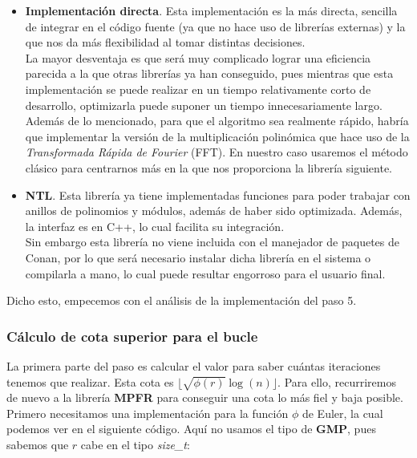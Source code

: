 \begin{itemize}
	\item \textbf{Implementación directa}. Esta implementación es la más directa, sencilla de integrar en el código fuente (ya que no hace uso de librerías externas) y la que nos da más flexibilidad al tomar distintas decisiones.\\
	
	La mayor desventaja es que será muy complicado lograr una eficiencia parecida a la que otras librerías ya han conseguido, pues mientras que esta implementación se puede realizar en un tiempo relativamente corto de desarrollo, optimizarla puede suponer un tiempo innecesariamente largo.\\
	
	Además de lo mencionado, para que el algoritmo sea realmente rápido, habría que implementar la versión de la multiplicación polinómica que hace uso de la \textit{Transformada Rápida de Fourier} (FFT). En nuestro caso usaremos el método clásico para centrarnos más en la que nos proporciona la librería siguiente.
	
	\item \textbf{NTL}. Esta librería ya tiene implementadas funciones para poder trabajar con anillos de polinomios y módulos, además de haber sido optimizada. Además, la interfaz es en C++, lo cual facilita su integración.\\
	
	Sin embargo esta librería no viene incluida con el manejador de paquetes de Conan, por lo que será necesario instalar dicha librería en el sistema o compilarla a mano, lo cual puede resultar engorroso para el usuario final.
\end{itemize}

Dicho esto, empecemos con el análisis de la implementación del paso 5.

\subsubsection{Cálculo de cota superior para el bucle}

La primera parte del paso es calcular el valor para saber cuántas iteraciones tenemos que realizar. Esta cota es $\lfloor \sqrt{\phi(r)}\log(n) \rfloor$. Para ello, recurriremos de nuevo a la librería \textbf{MPFR} para conseguir una cota lo más fiel y baja posible.\\

Primero necesitamos una implementación para la función $\phi$ de Euler, la cual podemos ver en el siguiente código. Aquí no usamos el tipo de \textbf{GMP}, pues sabemos que $r$ cabe en el tipo \textit{size\_t}:\\

